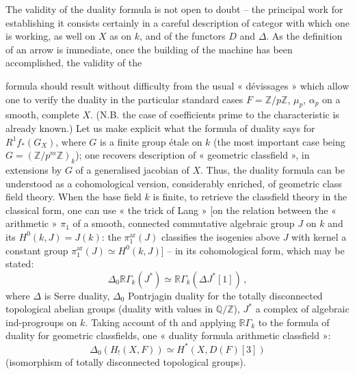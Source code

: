 \documentclass[11pt,a4paper]{article}
\begin{document}
The validity of the duality formula is not open to doubt -- the principal work for establishing it consists certainly in a careful description of   categor  with which one is working, as well on $X$ as on $k$, and of the functors $D$ and $\Delta$. As the definition of an arrow is immediate, once the building of the machine has been accomplished, the validity of the

formula should result without difficulty from the usual « dévissages » which allow one to verify the duality in the particular standard cases $F = \mathbb{Z}/p\mathbb{Z}$, $\mu_p$, $\alpha_p$ on a smooth, complete $X$. (N.B. the case of coefficients prime to the characteristic is already known.) Let us make explicit what the formula of duality says for $R^1f_*(G_X)$, where $G$ is a finite group étale on $k$ (the most important case being $G = (\mathbb{Z}/p^m\mathbb{Z})_k$); one recovers   description  of « geometric classfield », in   extensions by $G$ of a generalised jacobian of $X$. Thus, the duality formula can be understood as a cohomological version, considerably enriched, of geometric class field theory. When the base field $k$ is finite, to retrieve the classfield theory in the classical form, one can use « the trick of Lang » [on the relation between the « arithmetic » $\pi_1$ of a smooth, connected commutative algebraic group $J$ on $k$ and its $H^0(k, J) = J(k)$: the $\pi_1^{\mathrm{ar}}(J)$ classifies the isogenies above $J$ with kernel a constant group $\pi_1^{\mathrm{ar}}(J) \simeq H^0(k, J)$] -- in its cohomological form, which may be stated:
\[
\Delta_0 \mathbb{R}\Gamma_k(J^*) \simeq \mathbb{R}\Gamma_k(\Delta J^*[1]) \,,
\]
where $\Delta$ is Serre duality, $\Delta_0$ Pontrjagin duality for the totally disconnected topological abelian groups (duality with values in $\mathbb{Q}/\mathbb{Z}$), $J^*$ a complex of algebraic ind-progroups on $k$. Taking account of th   and applying $\mathbb{R}\Gamma_k$ to the formula of duality for geometric classfields, one   « duality formula   arithmetic classfield  »:
\[
\Delta_0(H_!(X, F)) \simeq H^*(X, D(F)[3])
\]
(isomorphism of totally disconnected topological groups).
\end{document}
